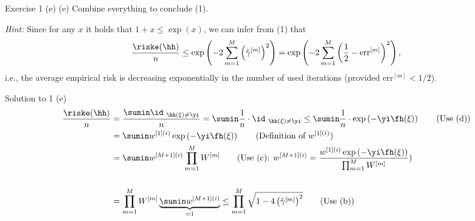 \documentclass[aspectratio=169]{beamer}
\newcommand{\gammahm}{\hat{\gamma}^{[m]}}
\newcommand{\errm}{\mathrm{err}^{[m]}}
\newcommand{\summM}{\sum_{m=1}^M}
\newcommand{\prodmM}{\prod_{m=1}^M}
\newcommand{\Wm}{W^{[m]}}
\newcommand{\wMponei}{w^{[M + 1](i)}}
\newcommand{\wonei}{w^{[1] (i)}}
\begin{document}
\begin{frame}{Exercise 1 (e)}
	(e) Combine everything to conclude (1).
	
	\emph{Hint:} Since for any $x$ it holds that $1 + x \leq \exp(x)$, we can infer from (1) that 
	\begin{align*}
		\frac{\riske(\hh)}{n} \leq \exp \left( - 2\summM \left(\gammahm \right)^2 \right) = \exp \left( -2 \summM \left( \frac{1}{2} - \errm \right)^2 \right),
	\end{align*}
	i.e., the average empirical risk is decreasing exponentially in the number of used iterations (provided $\errm < 1 / 2$).
\end{frame}

\begin{frame}{Solution to 1 (e)}
	\small
	\begin{align*}
		\frac{\riske(\hh)}{n} &= \frac{\sumin \id_{\ \hh(\xi) \neq \yi}}{n} = \sumin \frac{1}{n} \cdot \id_{\ \hh(\xi) \neq \yi} \leq \sumin \frac{1}{n} \cdot \exp\left(- \yi \fh(\xi) \right)  \qquad \text{(Use (d))}\\
		&= \sumin \wonei \exp \left( - \yi \fh(\xi) \right) \qquad \text{(Definition of $\wonei$)}\\
		&= \sumin \wMponei \prodmM \Wm \qquad \text{(Use (c): $\wMponei = \frac{\wonei \exp \left( - \yi \fh(\xi) \right)}{\prodmM \Wm }$)} \\ \\
		&= \prodmM \Wm \underbrace{\sumin \wMponei}_{=1} \leq \prodmM \sqrt{1 - 4 \left(\gammahm \right)^2} \qquad \text{(Use (b))}
	\end{align*}
\end{frame}
\end{document}
